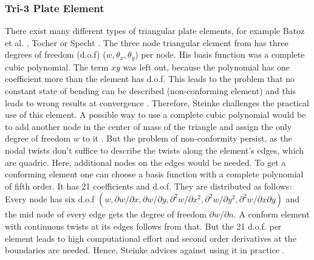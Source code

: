   \subsubsection{Tri-3 Plate Element}\label{sec:Shell-Plate-Tri}
  There exist many different types of triangular plate elements, for example Batoz et al. \cite{batoz1980study}, Tocher \cite{tocher1963analysis} or Specht \cite{specht1988modified}. The three node triangular element from \cite{tocher1963analysis} has three degrees of freedom (d.o.f) ($w, \theta_x, \theta_y$) per node. His basis function was a complete cubic polynomial. The term $xy$ was left out, because the polynomial has one coefficient more than the element has d.o.f. This leads to the problem that no constant state of bending can be described (non-conforming element) and this leads to wrong results at convergence \cite{steinke2005finite}. Therefore, Steinke challenges the practical use of this element.
  A possible way to use a complete cubic polynomial would be to add another node in the center of mass of the triangle and assign the only degree of freedom $w$ to it \cite{steinke2005finite}. But the problem of non-conformity persist, as the nodal twists don't suffice to describe the twists along the element's edges, which are quadric. Here, additional nodes on the edges would be needed.
  To get a conforming element one can choose a basis function with a complete polynomial of fifth order. It has 21 coefficients and d.o.f. They are distributed as follows: Every node has six d.o.f $(w, \partial w/\partial x, \partial w/\partial y, \partial^2 w/\partial x^2, \partial^2 w/\partial y^2, \partial^2 w/\partial x\partial y)$ and the mid node of every edge gets the degree of freedom $\partial w/\partial n$. A conform element with continuous twists at its edges follows from that. But the 21 d.o.f. per element leads to high computational effort and second order derivatives at the boundaries are needed. Hence, Steinke advices against using it in practice \cite{steinke2005finite}.
  
